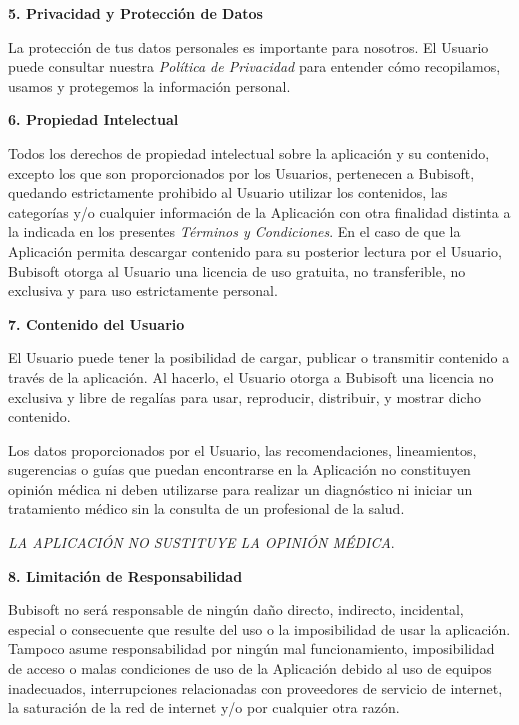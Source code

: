 \documentclass[a4paper,12pt]{article}
\begin{document}
    \par \textbf{5. Privacidad y Protección de Datos} 
    \newline
    \par La protección de tus datos personales es importante para nosotros. El Usuario puede consultar nuestra \textit{Política de Privacidad} para entender cómo recopilamos, usamos y protegemos la información personal. 
    \newline
    \par \textbf{6. Propiedad Intelectual} 
    \newline
    \par Todos los derechos de propiedad intelectual sobre la aplicación y su contenido, excepto los que son proporcionados por los Usuarios, pertenecen a Bubisoft, quedando estrictamente prohibido al Usuario utilizar los contenidos, las categorías y/o cualquier información de la Aplicación con otra finalidad distinta a la indicada en los presentes \textit{Términos y Condiciones}. En el caso de que la Aplicación permita descargar contenido para su posterior lectura por el Usuario, Bubisoft otorga al Usuario una licencia de uso gratuita, no transferible, no exclusiva y para uso estrictamente personal. 
    \newline
    \par \textbf{7. Contenido del Usuario} 
    \newline
    \par El Usuario puede tener la posibilidad de cargar, publicar o transmitir contenido a través de la aplicación. Al hacerlo, el Usuario otorga a Bubisoft una licencia no exclusiva y libre de regalías para usar, reproducir, distribuir, y mostrar dicho contenido.
    \par Los datos proporcionados por el Usuario, las recomendaciones, lineamientos, sugerencias o guías que puedan encontrarse en la Aplicación no constituyen opinión médica ni deben utilizarse para realizar un diagnóstico ni iniciar un tratamiento médico sin la consulta de un profesional de la salud.
    \par \textit{LA APLICACIÓN NO SUSTITUYE LA OPINIÓN MÉDICA}. 
    \newline
    \par \textbf{8. Limitación de Responsabilidad} 
    \newline
    \par Bubisoft no será responsable de ningún daño directo, indirecto, incidental, especial o consecuente que resulte del uso o la imposibilidad de usar la aplicación. Tampoco asume responsabilidad por ningún mal funcionamiento, imposibilidad de acceso o malas condiciones de uso de la Aplicación debido al uso de equipos inadecuados, interrupciones relacionadas con proveedores de servicio de internet, la saturación de la red de internet y/o por cualquier otra razón.
\end{document}
